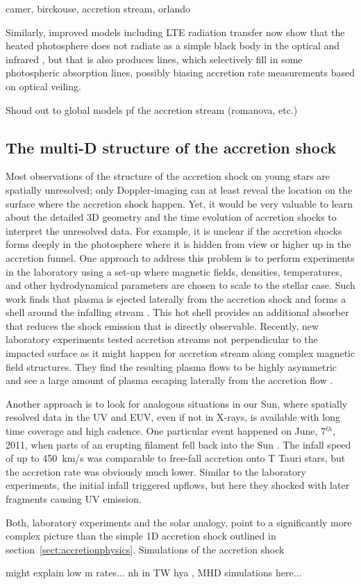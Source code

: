 camer, birckouse, accretion stream, orlando

Similarly, improved models including LTE radiation transfer now show that the heated photosphere does not radiate as a simple black body in the optical and infrared \cite{Dodin_2012,Dodin_2013}, but that is also produces lines, which selectively fill in some photospheric absorption lines, possibly biasing accretion rate measurements based on optical veiling.

Shoud out to global models pf the accretion stream (romanova, etc.)

\subsection{The multi-D structure of the accretion shock}

Most observations of the structure of the accretion shock on young stars are spatially unresolved; only Doppler-imaging can at least reveal the location on the surface where the accretion shock happen. Yet, it would be very valuable to learn about the detailed 3D geometry and the time evolution of accretion shocks to interpret the unresolved data. For example, it is unclear if the accretion shocks forms deeply in the photosphere where it is hidden from view or higher up in the accretion funnel. One approach to address this problem is to perform experiments in the laboratory using a set-up where magnetic fields, densities, temperatures, and other hydrodynamical parameters are chosen to scale to the stellar case. Such work finds that plasma is ejected laterally from the accretion shock and forms a shell around the infalling stream \cite{2017SciA....3E0982R} . This hot shell provides an additional absorber that reduces the shock emission that is directly observable. Recently, new laboratory experiments tested accretion streams not perpendicular to the impacted surface as it might happen for accretion stream along complex magnetic field structures. They find the resulting plasma flows to be highly asymmetric and see a large amount of plasma escaping laterally from the accretion flow \cite{2020A&A...642A..38B}.  

Another approach is to look for analogous situations in our Sun, where spatially resolved data in the UV and EUV, even if not in X-rays, is available with long time coverage and high cadence. One particular event happened on June, 7$^{th}$, 2011, when parts of an erupting filament fell back into the Sun \cite{2013Sci...341..251R,2013A&A...559A.127O}. The infall speed of up to 450~km/s was comparable to free-fall accretion onto T Tauri stars, but the accretion rate was obviously much lower. Similar to the laboratory experiments, the initial infall triggered upflows, but here they shocked with later fragments causing UV emission.

Both, laboratory experiments and the solar analogy, point to a significantly more complex picture than the simple 1D accretion shock outlined in section~\ref{sect:accretionphysics}. Simulations of the accretion shock 


might explain low m rates... nh in TW hya , MHD simulations here...

